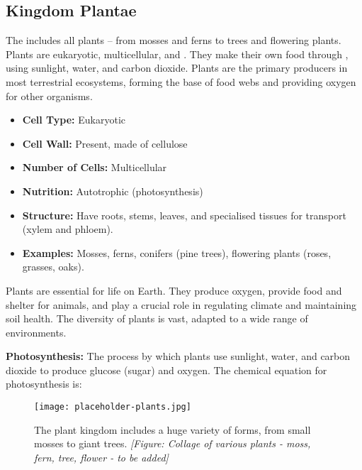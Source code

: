\subsection{Kingdom Plantae}

The  includes all plants – from mosses and ferns to trees and flowering plants. Plants are eukaryotic, multicellular, and . They make their own food through , using sunlight, water, and carbon dioxide. Plants are the primary producers in most terrestrial ecosystems, forming the base of food webs and providing oxygen for other organisms.

\begin{itemize}
    \item \textbf{Cell Type:} Eukaryotic
    \item \textbf{Cell Wall:} Present, made of cellulose
    \item \textbf{Number of Cells:} Multicellular
    \item \textbf{Nutrition:} Autotrophic (photosynthesis)
    \item \textbf{Structure:}  Have roots, stems, leaves, and specialised tissues for transport (xylem and phloem).
    \item \textbf{Examples:} Mosses, ferns, conifers (pine trees), flowering plants (roses, grasses, oaks).
\end{itemize}

Plants are essential for life on Earth. They produce oxygen, provide food and shelter for animals, and play a crucial role in regulating climate and maintaining soil health.  The diversity of plants is vast, adapted to a wide range of environments.

\begin{marginnote}
\textbf{Photosynthesis:} The process by which plants use sunlight, water, and carbon dioxide to produce glucose (sugar) and oxygen. The chemical equation for photosynthesis is:
\end{marginnote}

\begin{figure}
\centering
\texttt{[image: placeholder-plants.jpg]}
\caption{The plant kingdom includes a huge variety of forms, from small mosses to giant trees. \textit{[Figure: Collage of various plants - moss, fern, tree, flower - to be added]}}
\end{figure}


